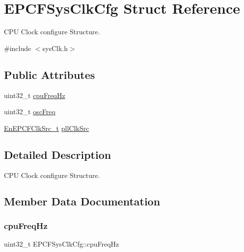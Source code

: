 \hypertarget{structEPCFSysClkCfg}{}\section{E\+P\+C\+F\+Sys\+Clk\+Cfg Struct Reference}
\label{structEPCFSysClkCfg}


C\+PU Clock configure Structure.  




{\ttfamily \#include $<$sys\+Clk.\+h$>$}

\subsection*{Public Attributes}
\begin{DoxyCompactItemize}
\item 
uint32\+\_\+t \mbox{\hyperlink{structEPCFSysClkCfg_a4d638d26115214a2783906e93fed691d}{cpu\+Freq\+Hz}}
\item 
uint32\+\_\+t \mbox{\hyperlink{structEPCFSysClkCfg_a6ace7c071137554a324a16a7bb573c96}{osc\+Freq}}
\item 
\mbox{\hyperlink{sysClk_8h_ab6caeb4d5ec4b52bd42c761f88c35b4e}{En\+E\+P\+C\+F\+Clk\+Src\+\_\+t}} \mbox{\hyperlink{structEPCFSysClkCfg_a715c895d582eeb014caaaf0d02478c16}{pll\+Clk\+Src}}
\end{DoxyCompactItemize}


\subsection{Detailed Description}
C\+PU Clock configure Structure. 

\subsection{Member Data Documentation}
\mbox{\label{structEPCFSysClkCfg_a4d638d26115214a2783906e93fed691d}} 
\subsubsection{\texorpdfstring{cpu\+Freq\+Hz}{cpuFreqHz}}
{\footnotesize\ttfamily uint32\+\_\+t E\+P\+C\+F\+Sys\+Clk\+Cfg\+::cpu\+Freq\+Hz}

